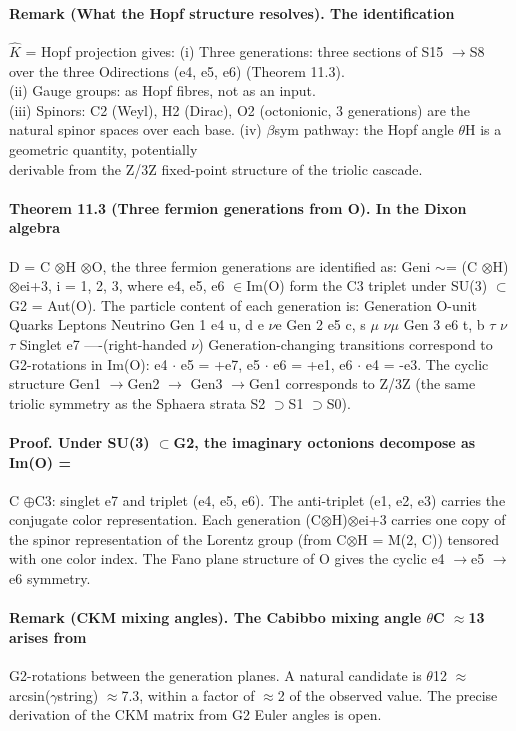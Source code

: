 \paragraph*{Remark (What the Hopf structure resolves). The identification}
$\hat K$ = Hopf projection gives:
(i) Three generations: three sections of S15 $\to$S8 over the three Odirections (e4, e5, e6) (Theorem 11.3).\\
(ii) Gauge groups: as Hopf fibres, not as an input.\\
(iii) Spinors: C2 (Weyl), H2 (Dirac), O2 (octonionic, 3 generations) are the\\
natural spinor spaces over each base.
(iv) $\beta$sym pathway: the Hopf angle $\theta$H is a geometric quantity, potentially\\
derivable from the Z/3Z fixed-point structure of the triolic cascade.
\paragraph*{Theorem 11.3 (Three fermion generations from O). In the Dixon algebra}
D = C $\otimes$H $\otimes$O, the three fermion generations are identified as: Geni $\sim$= (C $\otimes$H) $\otimes$ei+3, i = 1, 2, 3, where e4, e5, e6 $\in$Im(O) form the C3 triplet under SU(3) $\subset$G2 = Aut(O). The particle content of each generation is:
Generation O-unit Quarks Leptons Neutrino Gen 1 e4 u, d e $\nu$e Gen 2 e5 c, s $\mu$ $\nu$$\mu$ Gen 3 e6 t, b $\tau$ $\nu$$\tau$ Singlet e7 ----(right-handed $\nu$) Generation-changing transitions correspond to G2-rotations in Im(O): e4 $\cdot$ e5 = +e7, e5 $\cdot$ e6 = +e1, e6 $\cdot$ e4 = -e3. The cyclic structure Gen1 $\to$Gen2 $\to$ Gen3 $\to$Gen1 corresponds to Z/3Z (the same triolic symmetry as the Sphaera strata S2 $\supset$S1 $\supset$S0).
\paragraph*{Proof. Under SU(3) $\subset$G2, the imaginary octonions decompose as Im(O) =}
C $\oplus$C3: singlet e7 and triplet (e4, e5, e6). The anti-triplet (e1, e2, e3) carries the conjugate color representation. Each generation (C$\otimes$H)$\otimes$ei+3 carries one copy of the spinor representation of the Lorentz group (from C$\otimes$H = M(2, C)) tensored with one color index. The Fano plane structure of O gives the cyclic e4 $\to$e5 $\to$e6 symmetry.
\paragraph*{Remark (CKM mixing angles). The Cabibbo mixing angle $\theta$C $\approx$13 arises from}
G2-rotations between the generation planes. A natural candidate is $\theta$12 $\approx$ arcsin($\gamma$string) $\approx$7.3, within a factor of $\approx$2 of the observed value. The precise derivation of the CKM matrix from G2 Euler angles is open.
